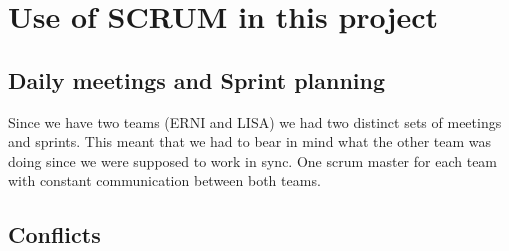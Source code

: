 \section{Use of SCRUM in this project}

\subsection{Daily meetings and Sprint planning}
Since we have two teams (ERNI and LISA) we had two distinct sets of meetings and sprints. This meant that we had to bear in mind what the other team was doing since we were supposed to work in sync. One scrum master for each team with constant communication between both teams. 

\subsection{Conflicts}
